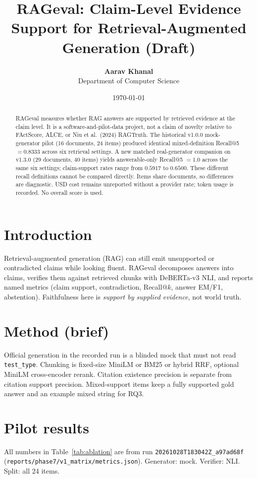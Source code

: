 \documentclass[10pt,twocolumn]{article}
\title{\textbf{RAGeval: Claim-Level Evidence Support for Retrieval-Augmented Generation (Draft)}}
\author{
  \textbf{Aarav Khanal} \\
  Department of Computer Science
}
\date{\today}
\begin{document}
\maketitle

\begin{abstract}
RAGeval measures whether RAG answers are supported by retrieved evidence at the claim level. It is a software-and-pilot-data project, not a claim of novelty relative to FActScore, ALCE, or Niu et al.\ (2024) RAGTruth. The historical v1.0.0 mock-generator pilot (16 documents, 24 items) produced identical mixed-definition Recall@5 $=0.8333$ across six retrieval settings. A new matched real-generator companion on v1.3.0 (29 documents, 40 items) yields answerable-only Recall@5 $=1.0$ across the same six settings; claim-support rates range from $0.5917$ to $0.6500$. These different recall definitions cannot be compared directly. Items share documents, so differences are diagnostic. USD cost remains unreported without a provider rate; token usage is recorded. No overall score is used.
\end{abstract}

\section{Introduction}
Retrieval-augmented generation (RAG) can still emit unsupported or contradicted claims while looking fluent. RAGeval decomposes answers into claims, verifies them against retrieved chunks with DeBERTa-v3 NLI, and reports named metrics (claim support, contradiction, Recall@$k$, answer EM/F1, abstention). Faithfulness here is \emph{support by supplied evidence}, not world truth.

\section{Method (brief)}
Official generation in the recorded run is a blinded mock that must not read \texttt{test\_type}. Chunking is fixed-size MiniLM or BM25 or hybrid RRF, optional MiniLM cross-encoder rerank. Citation existence precision is separate from citation support precision. Mixed-support items keep a fully supported gold answer and an example mixed string for RQ3.

\section{Pilot results}
\label{sec:results}
All numbers in Table~\ref{tab:ablation} are from run \texttt{20261028T183042Z\_a97ad68f} (\texttt{reports/phase7/v1\_matrix/metrics.json}). Generator: mock. Verifier: NLI. Split: all 24 items.
\end{document}
